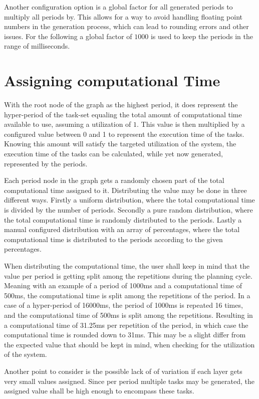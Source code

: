 Another configuration option is a global factor for all generated periods to multiply all periods by.
This allows for a way to avoid handling floating point numbers in the generation process, which can lead to rounding errors and other issues.
For the following a global factor of $1000$ is used to keep the periods in the range of milliseconds.

\section{Assigning computational Time}\label{subsec:impl:assigning-computational-time}
With the root node of the graph as the highest period, it does represent the hyper-period of the task-set equaling the total amount of computational time available to use, assuming a utilization of $1$.
This value is then multiplied by a configured value between 0 and 1 to represent the execution time of the tasks.
Knowing this amount will satisfy the targeted utilization of the system, the execution time of the tasks can be calculated, while yet now generated, represented by the periods.

Each period node in the graph gets a randomly chosen part of the total computational time assigned to it.
Distributing the value may be done in three different ways.
Firstly a uniform distribution, where the total computational time is divided by the number of periods.
Secondly a pure random distribution, where the total computational time is randomly distributed to the periods.
Lastly a manual configured distribution with an array of percentages, where the total computational time is distributed to the periods according to the given percentages.

When distributing the computational time, the user shall keep in mind that the value per period is getting split among the repetitions during the planning cycle.
Meaning with an example of a period of 1000ms and a computational time of 500ms, the computational time is split among the repetitions of the period.
In a case of a hyper-period of 16000ms, the period of 1000ms is repeated 16 times, and the computational time of 500ms is split among the repetitions.
Resulting in a computational time of 31.25ms per repetition of the period, in which case the computational time is rounded down to 31ms.
This may be a slight differ from the expected value that should be kept in mind, when checking for the utilization of the system.

Another point to consider is the possible lack of of variation if each layer gets very small values assigned.
Since per period multiple tasks may be generated, the assigned value shall be high enough to encompass these tasks.


